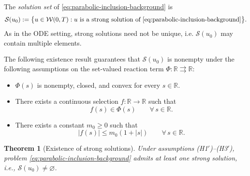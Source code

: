 \documentclass[11pt]{elsarticle}
\newtheorem{theorem}{Theorem}[section]
\theoremstyle{definition}
\theoremstyle{remark}
\numberwithin{equation}{section}
\begin{document}
The \emph{solution set} of \eqref{eq:parabolic-inclusion-background} is
\begin{equation}\label{eq:solution-PDI}
	\mathcal{S}(u_0)
	:=
	\bigl\{u\in\mathcal{W}(0,T):u\text{ is a strong solution of }
	\eqref{eq:parabolic-inclusion-background}\bigr\}.
\end{equation}
As in the ODE setting, strong solutions need not be unique, i.e. $\mathcal{S}(u_0)$
may contain multiple elements.

The following existence result guarantees that $\mathcal{S}(u_0)$ is
nonempty under the following assumptions on the set-valued reaction term
$\Phi:\mathbb{R}\rightrightarrows\mathbb{R}$:

\begin{itemize}
	\item[(H1$'$)] $\Phi(s)$ is nonempty, closed, and convex for every
	$s\in\mathbb{R}$.
	
	\item[(H2$'$)] There exists a continuous selection
	$f:\mathbb{R}\to\mathbb{R}$ such that
	\[
	f(s)\in\Phi(s)
	\qquad\forall\, s\in\mathbb{R}.
	\]
	
	\item[(H3$'$)] There exists a constant $m_0\ge 0$ such that
	\[
	|f(s)|\le m_0(1+|s|)
	\qquad\forall\, s\in\mathbb{R}.
	\]
\end{itemize}

\begin{theorem}[Existence of strong solutions]
	\label{thm:existence-pde}
	Under assumptions \textup{(H1$'$)--(H3$'$)}, problem
	\eqref{eq:parabolic-inclusion-background}
	admits at least one strong solution, i.e.,
	$\mathcal{S}(u_0)\neq\varnothing$.
\end{theorem}
\end{document}
